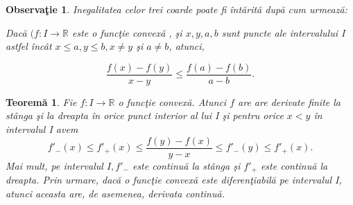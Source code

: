 \documentclass[a4paper,12pt,oneside]{report}
\newtheorem{theorem}{Teorem\u a}
\newtheorem{remark}{Observa\c{t}ie}
\begin{document}
\begin{remark}
Inegalitatea celor trei coarde poate fi \^{i}nt\u{a}rit\u{a} dup\u{a} cum urmeaz\u{a}: 

Dac\u{a} \((f : I \rightarrow \mathbb{R}\) este o func\c{t}ie convex\u{a} , \c{s}i \(x,y,a,b\) sunt puncte ale intervalului I astfel \^{i}nc\^{a}t \(x \leq a, y\leq b, x \neq y\) \c{s}i \(a \neq b\), atunci,
\end{remark}
\begin{displaymath}
   \frac{f\left ( x \right )- f\left ( y \right )}{x-y}\leq \frac{f\left ( a \right )- f\left ( b \right )}{a-b}.
\end{displaymath}
\begin{theorem}
Fie \(f : I \rightarrow \mathbb{R}\) o func\c{t}ie convex\u{a}. Atunci \(f\) are are derivate finite la st\^{a}nga \c{s}i la dreapta \^{i}n orice punct interior al lui I \c{s}i pentru orice \(x <y\) \^{i}n intervalul I avem
\begin{displaymath}
   {f}'_{-}\left ( x \right )\leq {f}'_{+}\left ( x \right )\leq \frac{f\left ( y \right )-f\left ( x \right )}{y-x}\leq {f}'_{-}\left ( y \right )\leq {f}'_{+}\left ( x \right ).
\end{displaymath}
Mai mult, pe intervalul \(I, {f}'_{-}\) este continu\u{a} la st\^{a}nga \c{s}i \({f}'_{+}\) este continu\u{a} la dreapta.
  Prin urmare, dac\u{a} o func\c{t}ie convex\u{a} este diferen\c{t}iabil\u{a} pe intervalul I, atunci aceasta are, de asemenea, derivata continu\u{a}.
\end{theorem}
\end{document}
